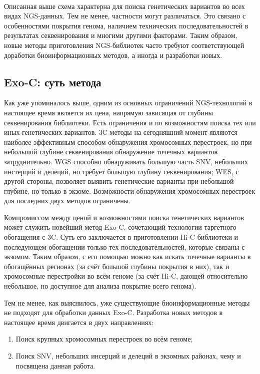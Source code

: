 \documentclass[a4paper,12pt]{article}
\begin{document}
~

Описанная выше схема характерна для поиска генетических вариантов во всех видах NGS-данных.
Тем не менее, частности могут различаться.
Это связано с особенностями покрытия генома, наличием технических последовательностей в результатах секвенирования и многими другими факторами.
Таким образом, новые методы приготовления NGS-библиотек часто требуют соответствующей доработки биоинформационных методов, а иногда и разработки новых.

\subsection{Exo-C: суть метода}

Как уже упоминалось выше, одним из основных ограничений NGS-технологий в настоящее время является их цена, напрямую зависящая от глубины секвенирования библиотеки.
Есть ограничения и по возможностям поиска тех или иных генетических вариантов.
3C методы на сегодняшний момент являются наиболее эффективным способом обнаружения хромосомных перестроек, но при небольшой глубине секвенирования обнаружение точечных вариантов затруднительно.
WGS способно обнаруживать большую часть SNV, небольших инстерций и делеций, но требует большую глубину секвенирования; WES, с другой стороны, позволяет выявить генетические варианты при небольшой глубине, но только в экзоме.
Возможности обнаружения хромосомных перестроек для последних двух методов ограничены.

Компромиссом между ценой и возможностями поиска генетических вариантов может служить новейший метод Exo-C, сочетающий технологии таргетного обогащения с 3C.
Суть его заключается в приготовлении Hi-C библиотеки и последующем обогащении только тех последовательностей, которые связаны с экзомом.
Таким образом, с его помощью можно как искать точечные варианты в обогащённых регионах (за счёт большой глубины покрытия в них), так и хромосомные перестройки во всём геноме (за счёт Hi-C, дающей относительно небольшое, но доступное для анализа покрытие всего генома)\cite{mozheiko}.

Тем не менее, как выяснилось, уже существующие биоинформационные методы не подходят для обработки данных Exo-C.
Разработка новых методов в настоящее время двигается в двух направлениях:

\begin{enumerate}
\item Поиск крупных хромосомных перестроек во всём геноме\cite{mozheiko};
\item Поиск SNV, небольших инсерций и делеций в экзомных районах, чему и посвящена данная работа.
\end{enumerate}
\end{document}
